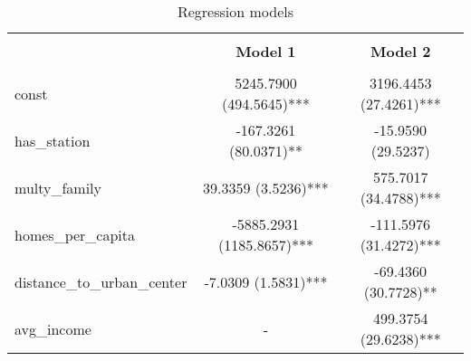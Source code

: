 
    \begin{table}[H]
        \centering
        \caption{Regression models}
        \vspace{10pt}
        \label{tab:regression_models}
        \begin{tabular}{lcc}
        \hline
        \hline \\[-1.8ex]
     & \textbf{Model 1} & \textbf{Model 2} \\
\hline \\[-1.8ex] 
const & 5245.7900 (494.5645)*** & 3196.4453 (27.4261)*** \\
has\_station & -167.3261 (80.0371)** & -15.9590 (29.5237) \\
multy\_family & 39.3359 (3.5236)*** & 575.7017 (34.4788)*** \\
homes\_per\_capita & -5885.2931 (1185.8657)*** & -111.5976 (31.4272)*** \\
distance\_to\_urban\_center & -7.0309 (1.5831)*** & -69.4360 (30.7728)** \\
avg\_income & - & 499.3754 (29.6238)*** \\

        \hline
        \hline
        \end{tabular}
    \end{table}
    